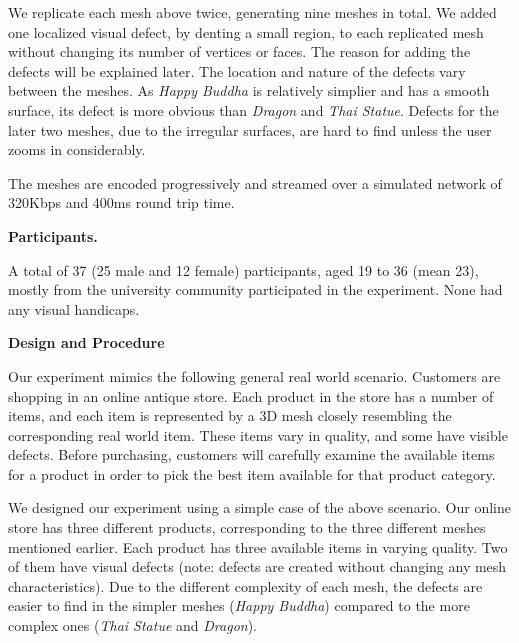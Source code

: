 We replicate each mesh above twice, generating nine meshes in total.  
We added one localized visual defect, by denting a small region, to each replicated mesh 
without changing its number of vertices or faces. The reason for adding the defects will be explained later. 
The location and nature of the
defects vary between the meshes. As \textit{Happy Buddha} is
relatively simplier and has a smooth surface, its defect is
 more obvious than \textit{Dragon}
and \textit{Thai Statue}.  Defects for the later two meshes, due to the
irregular surfaces, are hard to find unless the user zooms in
considerably.

The meshes are encoded progressively and streamed over a simulated network of 320Kbps and 400ms round trip time.  

\textbf{Participants.}

A total of 37 (25 male and 12 female) participants, aged 19 to 36
(mean 23), mostly from the university community participated in the
experiment. None had any visual handicaps.

\textbf{Design and Procedure}

Our experiment mimics the following general real world scenario. Customers
are shopping in an online antique store. Each product in the store has a
number of items, and each item is represented by a 3D mesh closely resembling
the corresponding real world item. These items vary in quality, and some
have visible defects. Before purchasing, customers will carefully examine the
available items for a product in order to pick the best item available for
that product category.

We designed our experiment using a simple case of the above scenario. 
Our online store has three different products,
corresponding to the three different meshes mentioned earlier. Each product
has three available items in varying quality. Two of them have visual
defects (note: defects are created without changing any mesh
characteristics). Due to the different complexity of each mesh, the defects
are easier to find in the simpler meshes (\textit{Happy Buddha}) compared to the more
complex ones (\textit{Thai Statue} and \textit{Dragon}).

